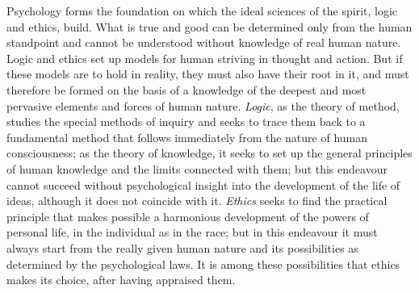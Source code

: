 \documentclass[12pt,a4paper]{book}
\newcommand{\opage}[1]{\marginnote{\footnotesize\textit{[#1]}}}
\begin{document}
Psychology forms the foundation on which the ideal sciences of the
spirit, logic and ethics, build. What is true and good can be determined
only from the human standpoint and cannot be understood without
knowledge of real human nature. Logic and ethics set up models for human
striving in thought and action. But if these models are to hold in
reality, they must also have their root in it, and must therefore be
formed on the basis of a knowledge of the deepest and most pervasive
elements and forces of human nature. \emph{Logic}, as the theory of
method, studies the special methods of inquiry and seeks to trace them
back to a fundamental method that follows immediately from the nature of
human consciousness;
\opage{34}as the theory of knowledge, it seeks to set up the general
principles of human knowledge and the limits connected with them; but
this endeavour cannot succeed without psychological insight into the
development of the life of ideas, although it does not coincide with it.
\emph{Ethics} seeks to find the practical principle that makes possible a
harmonious development of the powers of personal life, in the individual
as in the race; but in this endeavour it must always start from the
really given human nature and its possibilities as determined by the
psychological laws. It is among these possibilities that ethics makes its
choice, after having appraised them.
\end{document}
